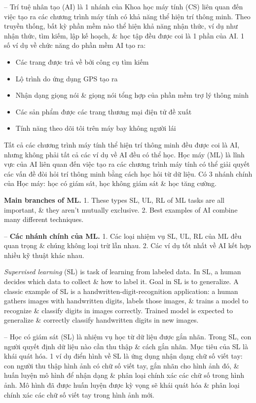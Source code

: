 \documentclass{article}
\begin{document}
\begin{itemize}
\begin{itemize}
\begin{itemize}
            -- Trí tuệ nhân tạo (AI) là 1 nhánh của Khoa học máy tính (CS) liên quan đến việc tạo ra các chương trình máy tính có khả năng thể hiện trí thông minh. Theo truyền thống, bất kỳ phần mềm nào thể hiện khả năng nhận thức, ví dụ như nhận thức, tìm kiếm, lập kế hoạch, \& học tập đều được coi là 1 phần của AI. 1 số ví dụ về chức năng do phần mềm AI tạo ra:
            \begin{itemize}
                \item Các trang được trả về bởi công cụ tìm kiếm
                \item Lộ trình do ứng dụng GPS tạo ra
                \item Nhận dạng giọng nói \& giọng nói tổng hợp của phần mềm trợ lý thông minh
                \item Các sản phẩm được các trang thương mại điện tử đề xuất
                \item Tính năng theo dõi tôi trên máy bay không người lái
            \end{itemize}
            Tất cả các chương trình máy tính thể hiện trí thông minh đều được coi là AI, nhưng không phải tất cả các ví dụ về AI đều có thể học. Học máy (ML) là lĩnh vực của AI liên quan đến việc tạo ra các chương trình máy tính có thể giải quyết các vấn đề đòi hỏi trí thông minh bằng cách học hỏi từ dữ liệu. Có 3 nhánh chính của Học máy: học có giám sát, học không giám sát \& học tăng cường.

            {\bf Main branches of ML.} 1. These types SL, UL, RL of ML tasks are all important, \& they aren't mutually exclusive. 2. Best examples of AI combine many different techniques.

            -- {\bf Các nhánh chính của ML.} 1. Các loại nhiệm vụ SL, UL, RL của ML đều quan trọng \& chúng không loại trừ lẫn nhau. 2. Các ví dụ tốt nhất về AI kết hợp nhiều kỹ thuật khác nhau.

            {\it Supervised learning} (SL) is task of learning from labeled data. In SL, a human decides which data to collect \& how to label it. Goal in SL is to generalize. A classic example of SL is a handwritten-digit-recognition application: a human gathers images with handwritten digits, labels those images, \& trains a model to recognize \& classify digits in images correctly. Trained model is expected to generalize \& correctly classify handwritten digits in new images.

            -- Học có giám sát (SL) là nhiệm vụ học từ dữ liệu được gắn nhãn. Trong SL, con người quyết định dữ liệu nào cần thu thập \& cách gắn nhãn. Mục tiêu của SL là khái quát hóa. 1 ví dụ điển hình về SL là ứng dụng nhận dạng chữ số viết tay: con người thu thập hình ảnh có chữ số viết tay, gắn nhãn cho hình ảnh đó, \& huấn luyện mô hình để nhận dạng \& phân loại chính xác các chữ số trong hình ảnh. Mô hình đã được huấn luyện được kỳ vọng sẽ khái quát hóa \& phân loại chính xác các chữ số viết tay trong hình ảnh mới.


\end{itemize}
\end{itemize}
\end{itemize}
\end{document}

